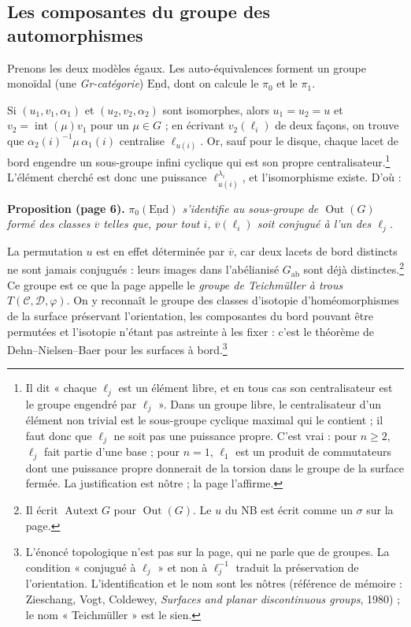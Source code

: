 \documentclass[11pt,a4paper]{article}
\begin{document}
\subsection*{Les composantes du groupe des automorphismes}

Prenons les deux modèles égaux. Les auto-équivalences forment un groupe
monoïdal (une \emph{Gr-catégorie}) $\underline{\mathrm{End}}$, dont on
calcule le $\pi_0$ et le $\pi_1$.

Si $(u_1, v_1, \alpha_1)$ et $(u_2, v_2, \alpha_2)$ sont isomorphes, alors
$u_1 = u_2 = u$ et $v_2 = \operatorname{int}(\mu) v_1$ pour un $\mu \in G$ ;
en écrivant $v_2(\ell_i)$ de deux façons, on trouve que
$\alpha_2(i)^{-1} \mu\, \alpha_1(i)$ centralise $\ell_{u(i)}$. Or, sauf pour
le disque, chaque lacet de bord engendre un sous-groupe infini cyclique qui
est son propre centralisateur.\footnote{Il dit « chaque $\ell_j$ est un
élément libre, et en tous cas son centralisateur est le groupe engendré par
$\ell_j$ ». Dans un groupe libre, le centralisateur d'un élément non trivial
est le sous-groupe cyclique maximal qui le contient ; il faut donc que
$\ell_j$ ne soit pas une puissance propre. C'est vrai : pour $n \geqslant 2$,
$\ell_j$ fait partie d'une base ; pour $n = 1$, $\ell_1$ est un produit de
commutateurs dont une puissance propre donnerait de la torsion dans le groupe
de la surface fermée. La justification est nôtre ; la page l'affirme.}
L'élément cherché est donc une puissance $\ell_{u(i)}^{\lambda_i}$, et
l'isomorphisme existe. D'où :

\textbf{Proposition (page 6).} \emph{$\pi_0(\underline{\mathrm{End}})$
s'identifie au sous-groupe de $\operatorname{Out}(G)$ formé des classes
$\overline{v}$ telles que, pour tout $i$, $\overline{v}(\ell_i)$ soit conjugué
à l'un des $\ell_j$.}

La permutation $u$ est en effet déterminée par $\overline{v}$, car deux lacets
de bord distincts ne sont jamais conjugués : leurs images dans l'abélianisé
$G_{\mathrm{ab}}$ sont déjà distinctes.\footnote{Il écrit
$\operatorname{Autext} G$ pour $\operatorname{Out}(G)$. Le $u$ du NB est
écrit comme un $\sigma$ sur la page.} Ce groupe est ce que la page appelle le
\emph{groupe de Teichmüller à trous} $T(\mathcal{C}, \mathcal{D}, \varphi)$.
On y reconnaît le groupe des classes d'isotopie d'homéomorphismes de la
surface préservant l'orientation, les composantes du bord pouvant être
permutées et l'isotopie n'étant pas astreinte à les fixer : c'est le
théorème de Dehn--Nielsen--Baer pour les surfaces à bord.\footnote{L'énoncé
topologique n'est pas sur la page, qui ne parle que de groupes. La condition
« conjugué à $\ell_j$ » et non à $\ell_j^{-1}$ traduit la préservation de
l'orientation. L'identification et le nom sont les nôtres (référence de
mémoire : Zieschang, Vogt, Coldewey, \emph{Surfaces and planar
discontinuous groups}, 1980) ; le nom « Teichmüller » est le sien.}
\end{document}

